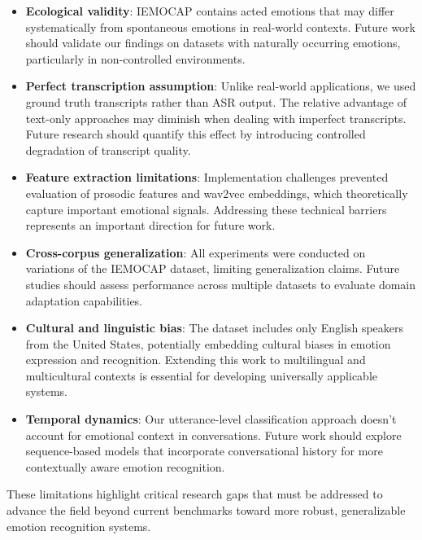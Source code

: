 \documentclass[12pt]{article}
\begin{document}
\begin{itemize}
    \item \textbf{Ecological validity}: IEMOCAP contains acted emotions that may differ systematically from spontaneous emotions in real-world contexts. Future work should validate our findings on datasets with naturally occurring emotions, particularly in non-controlled environments.
    
    \item \textbf{Perfect transcription assumption}: Unlike real-world applications, we used ground truth transcripts rather than ASR output. The relative advantage of text-only approaches may diminish when dealing with imperfect transcripts. Future research should quantify this effect by introducing controlled degradation of transcript quality.
    
    \item \textbf{Feature extraction limitations}: Implementation challenges prevented evaluation of prosodic features and wav2vec embeddings, which theoretically capture important emotional signals. Addressing these technical barriers represents an important direction for future work.
    
    \item \textbf{Cross-corpus generalization}: All experiments were conducted on variations of the IEMOCAP dataset, limiting generalization claims. Future studies should assess performance across multiple datasets to evaluate domain adaptation capabilities.
    
    \item \textbf{Cultural and linguistic bias}: The dataset includes only English speakers from the United States, potentially embedding cultural biases in emotion expression and recognition. Extending this work to multilingual and multicultural contexts is essential for developing universally applicable systems.
    
    \item \textbf{Temporal dynamics}: Our utterance-level classification approach doesn't account for emotional context in conversations. Future work should explore sequence-based models that incorporate conversational history for more contextually aware emotion recognition.
\end{itemize}

These limitations highlight critical research gaps that must be addressed to advance the field beyond current benchmarks toward more robust, generalizable emotion recognition systems.
\end{document}
